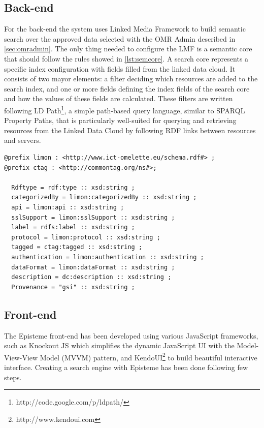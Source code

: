 \subsection{Back-end}
\label{subsec:omrclientback}
For the back-end the system uses Linked Media Framework to build semantic search over the approved data selected with the OMR Admin described in \ref{sec:omradmin}.
The only thing needed to configure the LMF is a semantic core that should follow the rules showed in \ref{lst:semcore}. A search core represents a specific index configuration with fields filled from the linked data cloud. It consists of two mayor elements: a filter deciding which resources are added to the search index, and one or more fields defining the index fields of the search core and how the values of these fields are calculated.
These filters are written following LD Path\footnote{http://code.google.com/p/ldpath/}, a simple path-based query language, similar to SPARQL Property Paths, that is particularly well-suited for querying and retrieving resources from the Linked Data Cloud by following RDF links between resources and servers.

\newpage

\begin{lstlisting}[breaklines=true, style=consola, caption={Semantic core configuration for LMF using LD Path}, label={lst:semcore}]
@prefix limon : <http://www.ict-omelette.eu/schema.rdf#> ;
@prefix ctag : <http://commontag.org/ns#>;
  
  Rdftype = rdf:type :: xsd:string ;
  categorizedBy = limon:categorizedBy :: xsd:string ;
  api = limon:api :: xsd:string ;
  sslSupport = limon:sslSupport :: xsd:string ;
  label = rdfs:label :: xsd:string ;
  protocol = limon:protocol :: xsd:string ;
  tagged = ctag:tagged :: xsd:string ;
  authentication = limon:authentication :: xsd:string ;
  dataFormat = limon:dataFormat :: xsd:string ;
  description = dc:description :: xsd:string ;
  Provenance = "gsi" :: xsd:string ;
\end{lstlisting}

\subsection{Front-end}
\label{subsec:omrclientfront}
The Episteme front-end has been developed using various JavaScript frameworks, such as Knockout JS which simplifies the dynamic JavaScript UI with the Model-View-View Model (MVVM) pattern, and KendoUI\footnote{http://www.kendoui.com} to build beautiful interactive interface.
Creating a search engine with Episteme has been done following few steps.

